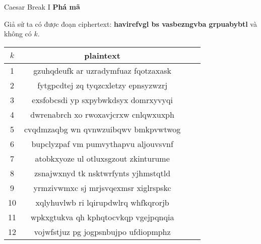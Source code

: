 \begin{frame}{Caesar Break I}
\textbf{Phá mã}

Giả sử ta có được đoạn ciphertext: \textbf{havirefvgl bs vasbezngvba grpuabybtl} và không có $k$.

\begin{table}
\begin{tabular}{| c | c | c | c |}
\hline
$k$ & plaintext \\ \hline
1 & gzuhqdeufk ar uzradymfuaz fqotzaxask \\ \hline
2 & fytgpcdtej zq tyqzcxletzy epnsyzwzrj \\ \hline
3 & exsfobcsdi yp sxpybwkdsyx domrxyvyqi \\ \hline
4 & dwrenabrch xo rwoxavjcrxw cnlqwxuxph \\ \hline
5 & cvqdmzaqbg wn qvnwzuibqwv bmkpvwtwog \\ \hline
6 & bupclyzpaf vm pumvythapvu aljouvsvnf \\ \hline
7 & atobkxyoze ul otluxsgzout zkinturume \\ \hline
8 & zsnajwxnyd tk nsktwrfynts yjhmstqtld \\ \hline
9 & yrmzivwmxc sj mrjsvqexmsr xiglrspskc \\ \hline
10 & xqlyhuvlwb ri lqirupdwlrq whfkqrorjb \\ \hline
11 & wpkxgtukva qh kphqtocvkqp vgejpqnqia \\ \hline
12 & vojwfstjuz pg jogpsnbujpo ufdiopmphz \\ \hline
\end{tabular}
\end{table}
\end{frame}

